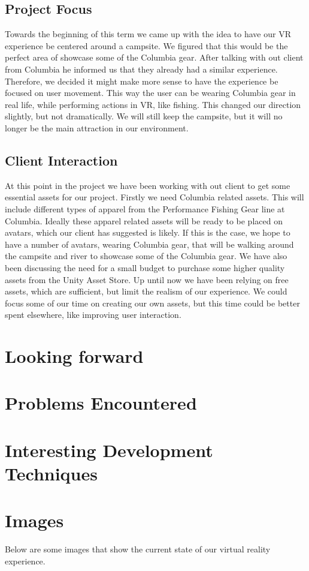\documentclass[10pt,journal,compsoc,onecolumn, draftclsnofoot]{IEEEtran}
\begin{document}
\subsection{Project Focus}
Towards the beginning of this term we came up with the idea to have our VR experience be centered around a campsite.
We figured that this would be the perfect area of showcase some of the Columbia gear.
After talking with out client from Columbia he informed us that they already had a similar experience.
Therefore, we decided it might make more sense to have the experience be focused on user movement.
This way the user can be wearing Columbia gear in real life, while performing actions in VR, like fishing.
This changed our direction slightly, but not dramatically.
We will still keep the campsite, but it will no longer be the main attraction in our environment.

\subsection{Client Interaction}
At this point in the project we have been working with out client to get some essential assets for our project.
Firstly we need Columbia related assets.
This will include different types of apparel from the Performance Fishing Gear line at Columbia.
Ideally these apparel related assets will be ready to be placed on avatars, which our client has suggested is likely.
If this is the case, we hope to have a number of avatars, wearing Columbia gear, that will be walking around the campsite and river to showcase some of the Columbia gear.
We have also been discussing the need for a small budget to purchase some higher quality assets from the Unity Asset Store.
Up until now we have been relying on free assets, which are sufficient, but limit the realism of our experience.
We could focus some of our time on creating our own assets, but this time could be better spent elsewhere, like improving user interaction.

\section{Looking forward}

\section{Problems Encountered}

\section{Interesting Development Techniques}

\section{Images}
Below are some images that show the current state of our virtual reality experience.
\end{document}

